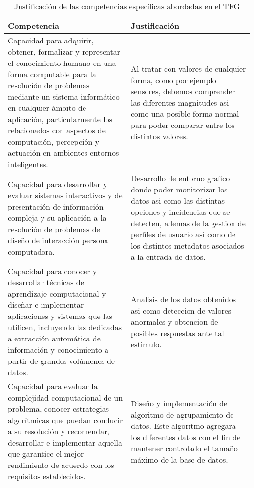 \documentclass{pre-tfg}
\begin{document}
\begin{table}[hp]
  \centering
  \caption{Justificación de las competencias específicas abordadas en el TFG}
  \label{tab:competencias}

  \begin{tabular}{p{0.5\linewidth}p{0.5\linewidth}}
    \textbf{Competencia} & \textbf{Justificación} \\
    \hline
    Capacidad para adquirir, obtener, formalizar y representar el conocimiento humano en una forma computable para la resolución de problemas mediante un sistema informático en cualquier ámbito de aplicación, particularmente los relacionados con aspectos de computación, percepción y actuación en ambientes entornos inteligentes.
    & Al tratar con valores de cualquier forma, como por ejemplo
    sensores, debemos comprender las diferentes magnitudes asi como una
    posible forma normal para poder comparar entre los distintos valores.\\
    Capacidad para desarrollar y evaluar sistemas interactivos y de
    presentación de información compleja y su aplicación a la resolución
    de problemas de diseño de interacción persona computadora.
    & Desarrollo de entorno grafico donde poder monitorizar los datos
      asi como las distintas opciones y incidencias que se detecten,
      ademas de la gestion de perfiles de usuario asi como de los
      distintos metadatos asociados a la entrada de datos.\\
    Capacidad para conocer y desarrollar técnicas de aprendizaje computacional y diseñar e implementar aplicaciones y sistemas que las utilicen, incluyendo las dedicadas a extracción automática de información y conocimiento a partir de grandes volúmenes de datos.
    & Analisis de los datos obtenidos asi como  deteccion de valores anormales y obtencion de posibles respuestas ante tal estimulo.\\
    Capacidad para evaluar la complejidad computacional de un problema, conocer estrategias algorítmicas que puedan conducir a su resolución y recomendar, desarrollar e implementar aquella que garantice el mejor rendimiento de acuerdo con los requisitos establecidos.
    & Diseño y implementación de algoritmo de agrupamiento de datos. Este algoritmo agregara los diferentes datos con el fin de mantener controlado el tamaño máximo de la base de datos.\\
    \hline
  \end{tabular}
\end{table}
 \clearpage
\end{document}
